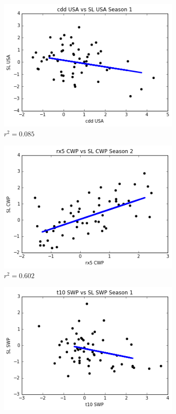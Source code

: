 \documentclass[12pt]{report}
\begin{document}
	
	\begin{figure}[htbp]
\centering 
\begin{subfigure}{.5\textwidth}
\centering
\includegraphics[scale = .6]{graphs/CDDLinearMaxS1USA0085.png}
\caption{$r^2 = 0.085$}
\label{fig:LinearMaxCDD}
\end{subfigure}%
\begin{subfigure}{.5\textwidth}
\centering
\includegraphics[scale = .6]{graphs/RX5LinearMaxS2CWP0602.png}
\caption{$r^2 = 0.602$}
\label{fig:LinearMaxRX5}
\end{subfigure}
\begin{subfigure}{.5\textwidth}
\centering
\includegraphics[scale = .6]{graphs/T10LinearMaxS1SWP019.png}

\end{subfigure}
\end{figure}
\end{document}
